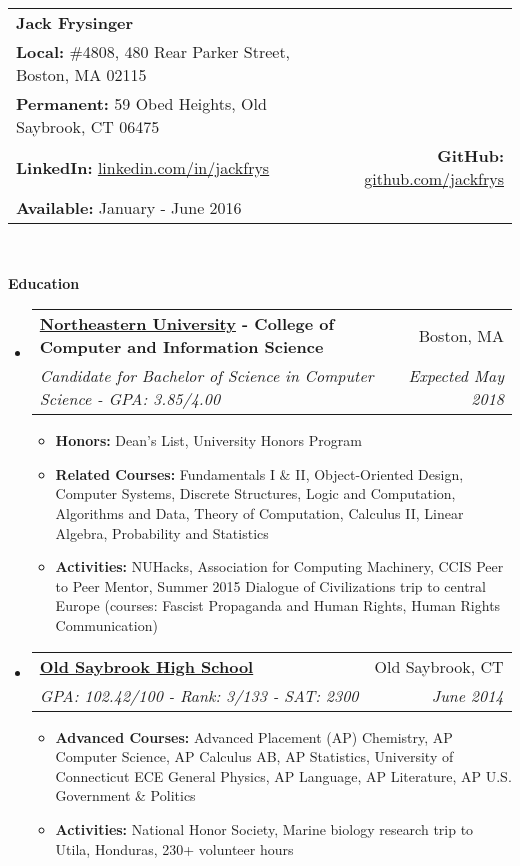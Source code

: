 \documentclass[letterpaper,10.6pt]{article}
\makeatletter
\newcommand{\resitem}[1]{\item #1 \vspace{-2pt}}
\newcommand{\resheading}[1]{{\large \colorbox{mygrey}{\begin{minipage}{\textwidth}{\textbf{#1 \vphantom{p\^{E}}}}\end{minipage}}}}
\newcommand{\ressubheading}[4]{
\begin{tabular*}{6.8in}{l@{\extracolsep{\fill}}r}
		\textbf{#1} & #2 \\
		\emph{#3} & \emph{#4} \\
\end{tabular*}\vspace{-6pt}}
\makeatother
\begin{document}
\newcommand{\mywebheader}{
\begin{tabular*}{7in}{l@{\extracolsep{\fill}}r}
	\textbf{\LARGE Jack Frysinger} &
	\\
	\textbf{Local:} \#4808, 480 Rear Parker Street, Boston, MA 02115 &
	\\\textbf{Permanent:} 59 Obed Heights, Old Saybrook, CT 06475 &
	\\
	\textbf{LinkedIn:} \href{http://linkedin.com/in/jackfrys}{linkedin.com/in/jackfrys} & \textbf{GitHub:} \href{https://github.com/jackfrys}{github.com/jackfrys}
	\\
	\textbf{Available:} January - June 2016
	\end{tabular*}
\\
\vspace{0.1in}}

\mywebheader

\resheading{Education}
	\begin{itemize}[leftmargin=*]
		\item[]
			\ressubheading{\href{http://www.northeastern.edu}{Northeastern University} - College of Computer and Information Science}{Boston, MA}{{Candidate for Bachelor of Science in Computer Science - }{GPA: 3.85/4.00}}{Expected May 2018}
				{ \footnotesize
				\begin{itemize}
					\resitem{\textbf{Honors:} Dean's List, University Honors Program}
					\resitem{\textbf{Related Courses:} Fundamentals I \& II, Object-Oriented Design, Computer Systems, Discrete Structures, Logic and Computation, Algorithms and Data, Theory of Computation, Calculus II, Linear Algebra, Probability and Statistics}
					\resitem{\textbf{Activities:} NUHacks, Association for Computing Machinery, CCIS Peer to Peer Mentor, Summer 2015 Dialogue of Civilizations trip to central Europe (courses: Fascist Propaganda and Human Rights, Human Rights Communication)}
				\end{itemize}}
		\item[]
			\ressubheading{\href{http://www.oldsaybrookschools.org/page.cfm?p=605}{Old Saybrook High School}}{Old Saybrook, CT}{{GPA: 102.42/100 - Rank: 3/133 - SAT: 2300}}{June 2014}
			{\footnotesize
			\begin{itemize}
				\resitem{\textbf{Advanced Courses:} Advanced Placement (AP) Chemistry, AP Computer Science, AP Calculus AB, AP Statistics, University of Connecticut ECE General Physics, AP Language, AP Literature, AP U.S. Government \& Politics}
				\resitem{\textbf{Activities:} National Honor Society, Marine biology research trip to Utila, Honduras, 230+ volunteer hours}
			\end{itemize}}
	\end{itemize} %
	
\end{document}
